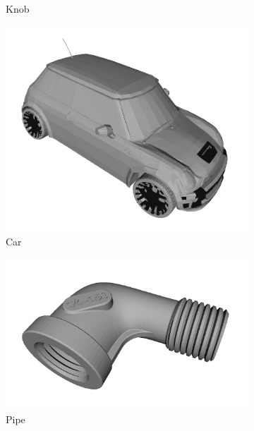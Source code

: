 \begin{figure}[t]
\begin{subfigure}[b]{0.19\linewidth}
		\caption{Knob}
	\end{subfigure} 
	\begin{subfigure}[b]{0.19\linewidth} \centering
		\includegraphics[width=1\linewidth]{./fig/eval/toshiba_mini1.png}
		\caption{Car}
	\end{subfigure}
	\begin{subfigure}[b]{0.19\linewidth} \centering
		\includegraphics[width=1\linewidth]{./fig/eval/toshiba_pipe1.png}
		\caption{Pipe}
	\end{subfigure}
	\begin{subfigure}[b]{0.19\linewidth} \centering

\end{subfigure}
\end{figure}

